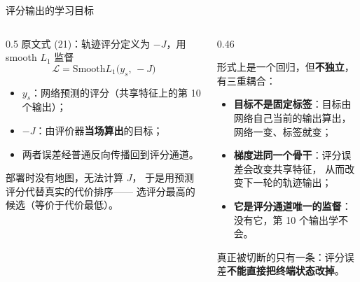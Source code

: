 \begin{frame}{评分输出的学习目标}
  \small
  \begin{columns}[t]
    \begin{column}{0.5\textwidth}
      原文式 (21)：轨迹评分定义为 $-J$，用 smooth $L_1$ 监督
      \[
        \mathcal L=\text{Smooth}L_1\bigl(y_s,\,-J\bigr)
      \]
      \begin{itemize}\tight
        \item $y_s$：网络预测的评分（共享特征上的第 10 个输出）；
        \item $-J$：由评价器\textbf{当场算出}的目标；
        \item 两者误差经普通反向传播回到评分通道。
      \end{itemize}
      \begin{paperfinding}[在线如何使用]
        \footnotesize
        部署时没有地图，无法计算 $J$，
        于是用预测评分代替真实的代价排序——
        选评分最高的候选（等价于代价最低）。
      \end{paperfinding}
    \end{column}
    \begin{column}{0.46\textwidth}
      \begin{reading}[“评分是不是一个独立回归问题”]
        \small
        形式上是一个回归，但\textbf{不独立}，有三重耦合：
        \begin{itemize}\tight
          \item \textbf{目标不是固定标签}：目标由网络自己当前的输出算出，
                网络一变、标签就变；
          \item \textbf{梯度进同一个骨干}：评分误差会改变共享特征，
                从而改变下一轮的轨迹输出；
          \item \textbf{它是评分通道唯一的监督}：没有它，第 10 个输出学不会。
        \end{itemize}
        真正被切断的只有一条：评分误差\textbf{不能直接把终端状态改掉}。
      \end{reading}
    \end{column}
  \end{columns}
\end{frame}

